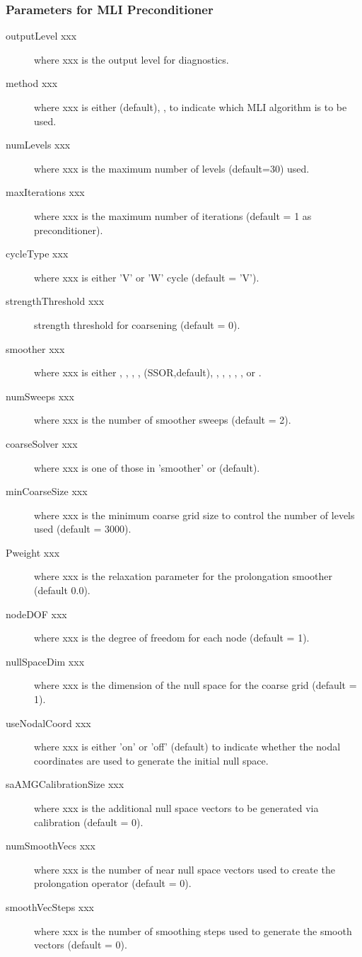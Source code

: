 \subsubsection{Parameters for MLI Preconditioner}
                                                                                
\begin{description}
\item[outputLevel xxx] where xxx is the output level for diagnostics.
\item[method xxx] where xxx is either  (default), ,
     to indicate which MLI algorithm is to be used.
\item[numLevels xxx] where xxx is the maximum number of levels (default=30)
     used.
\item[maxIterations xxx] where xxx is the maximum number of iterations
     (default = 1 as preconditioner).
\item[cycleType xxx] where xxx is either 'V' or 'W' cycle (default = 'V').
\item[strengthThreshold xxx] strength threshold for coarsening (default = 0).
\item[smoother xxx] where xxx is either , , ,
     ,  (SSOR,default), , ,
     , , , or .
\item[numSweeps xxx] where xxx is the number of smoother sweeps (default = 2).
\item[coarseSolver xxx] where xxx is one of those in 'smoother' or
      (default).
\item[minCoarseSize xxx] where xxx is the minimum coarse grid size to
     control the number of levels used (default = 3000).
\item[Pweight xxx] where xxx is the relaxation parameter for the prolongation
     smoother (default 0.0).
\item[nodeDOF xxx] where xxx is the degree of freedom for each node
     (default = 1).
\item[nullSpaceDim xxx] where xxx is the dimension of the null space for
     the coarse grid (default = 1).
\item[useNodalCoord xxx] where xxx is either 'on' or 'off' (default)
     to indicate whether the nodal coordinates are used to generate the
     initial null space.
\item[saAMGCalibrationSize xxx] where xxx is the additional null space
     vectors to be generated via calibration (default = 0).
\item[numSmoothVecs xxx] where xxx is the number of near null space
     vectors used to create the prolongation operator (default = 0).
\item[smoothVecSteps xxx] where xxx is the number of smoothing steps
     used to generate the smooth vectors (default = 0).
\end{description}
                                                                                
